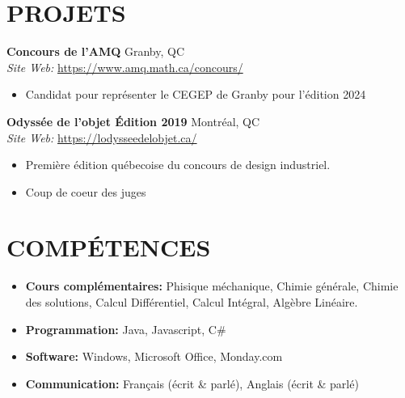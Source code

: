 \documentclass[a4paper,9pt]{extarticle}
\begin{document}
\section*{PROJETS}
\noindent
\textbf{Concours de l'AMQ} \hfill Granby, QC\\ %
\textit{Site Web:} \url{https://www.amq.math.ca/concours/} \hfill %
\begin{itemize}
    \item Candidat pour représenter le CEGEP de Granby pour l'édition 2024
\end{itemize}

\noindent
\textbf{Odyssée de l'objet Édition 2019} \hfill Montréal, QC\\ %
\textit{Site Web:} \url{https://lodysseedelobjet.ca/} \hfill %
\begin{itemize}
    \item Première édition québecoise du concours de design industriel. 
    \item Coup de coeur des juges
\end{itemize}
\section*{COMPÉTENCES}
\begin{itemize}
    \item \textbf{Cours complémentaires: } Phisique méchanique, Chimie générale, Chimie des solutions, Calcul Différentiel, Calcul Intégral, Algèbre Linéaire. 
    \item \textbf{Programmation:} Java, Javascript, C\#
    \item \textbf{Software:} Windows, Microsoft Office, Monday.com 
    \item \textbf{Communication:} Français (écrit \& parlé), Anglais (écrit \& parlé) %
\end{itemize}

\end{document}
